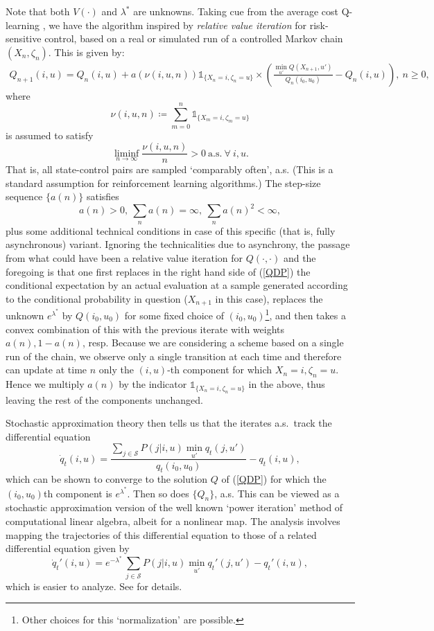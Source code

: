 \documentclass[notitlepage,11pt,reqno]{amsart}
\numberwithin{equation}{section}
\theoremstyle{plain}
\theoremstyle{definition}
\theoremstyle{remark}
\newcommand{\Ind}{\mathds{1}}       %
\newcommand{\cS}{{\mathcal{S}}}     %
\newcommand{\df}{\coloneqq}
\begin{document}
Note that both $V(\cdot)$ and $\lambda^*$ are unknowns. Taking cue from the average cost Q-learning \cite{ABB}, we have the algorithm inspired by {\it relative value iteration} for risk-sensitive control, based on a real or simulated run of a controlled Markov chain $(X_n,\zeta_n)$. This is given by:
\begin{align}
Q_{n+1}(i,u) = Q_n(i,u) + a(\nu(i,u,n))\Ind_{\{X_n = i, \zeta_n = u\}}\times\left(\frac{\min_{u'}Q(X_{n+1},u')}{Q_n(i_0,u_0)} - Q_n(i,u)\right), \ n \geq 0,\label{Qlearn}
\end{align}
where 
$$\nu(i,u,n) \df \sum_{m=0}^n \Ind_{\{X_m = i, \zeta_m = u\}}$$
is assumed to satisfy
$$\liminf_{n\to\infty}\frac{\nu(i,u,n)}{n} > 0 \ \mbox{a.s.} \ \forall \ i,u.
$$
That is, all state-control pairs are sampled  `comparably often', a.s. (This is a standard assumption for reinforcement learning algorithms.) The step-size sequence $\{a(n)\}$ satisfies
\begin{equation}
a(n) > 0, \ \sum_na(n) = \infty, \ \sum_na(n)^2 < \infty, \label{RM}
\end{equation}
plus some additional technical conditions in case of this specific (that is, fully asynchronous)  variant. Ignoring the technicalities due to asynchrony, the passage from what could have been a relative value iteration for $Q(\cdot,\cdot)$ and the foregoing is that one first replaces in the right hand side of (\ref{QDP})  the conditional expectation by an actual evaluation at a sample generated according to the conditional probability in question ($X_{n+1}$ in this case), replaces the unknown  $e^{\lambda^*}$ by $Q(i_0,u_0)$ for some fixed choice of $(i_0,u_0)$\footnote{Other choices for this `normalization' are possible.}, and then takes a convex combination of this with the previous iterate with weights $a(n), 1 - a(n)$, resp. Because we are considering a scheme based on a single run of the chain, we observe only a single transition at each time and therefore can update at time $n$ only the $(i,u)$-th component for which $X_n = i, \zeta_n = u$. Hence we multiply $a(n)$ by the indicator $\Ind_{\{X_n = i,\zeta_n=u\}}$ in the above, thus leaving the rest of the components unchanged.


Stochastic approximation theory then tells us that the iterates a.s.\ track the differential equation
$$
\dot{q}_t(i,u) = \frac{\sum_{j\in\cS} P(j|i,u)\min_{u'}q_t(j,u')}{q_t(i_0,u_0)} - q_t(i,u),
$$
which can be shown to converge to the solution $Q$ of (\ref{QDP}) for which the $(i_0,u_0)$th component is $e^{\lambda^*}$. Then so does $\{Q_n\}$, a.s. This can be viewed as a stochastic approximation version of the well known `power iteration' method of computational linear algebra, albeit for a nonlinear map. The analysis involves mapping the trajectories of this differential equation to those of a related differential equation given by
$$
\dot{q}_t'(i,u) = e^{-\lambda^*}\,\sum_{j\in\cS} P(j|i,u)\min_{u'}q_t'(j,u') - q_t'(i,u),
$$
which is easier to analyze. See \cite{MR1908528} for details.
\end{document}
